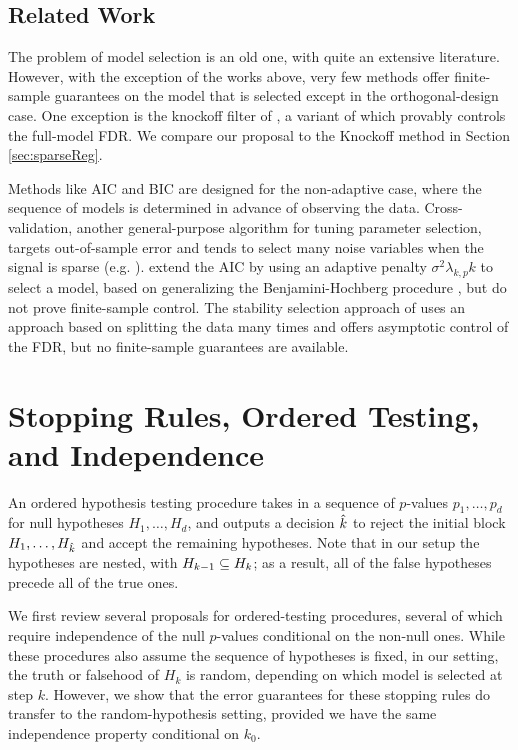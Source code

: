 \documentclass{article}
\begin{document}
\subsection{Related Work}

The problem of model selection is an old one, with quite an extensive literature. However, with the exception of the works above, very few methods offer finite-sample guarantees on the model that is selected except in the orthogonal-design case. One  exception is the knockoff filter of \citet{barber2014controlling}, a variant of which provably controls the full-model FDR.
We compare our proposal to the Knockoff method in Section \ref{sec:sparseReg}.

Methods like AIC \citet{akaike1974new} and BIC \citep{schwarz1978estimating} are designed for the non-adaptive case, where the sequence of models is determined in advance of observing the data. Cross-validation, another general-purpose algorithm for tuning parameter selection, targets out-of-sample error and tends to select many noise variables when the signal is sparse (e.g. \cite{LY2015}).   \citet{benjamini2009simple} extend the AIC by using an adaptive penalty $\sigma^2\lambda_{k,p} k$ to select a model, based on generalizing the Benjamini-Hochberg procedure \citet{benjamini1995controlling}, but do not prove finite-sample control. The stability selection approach of \citet{meinshausen2010stability} uses an approach based on splitting the data many times and offers asymptotic control of the FDR, but no finite-sample guarantees are available.

\section{Stopping Rules, Ordered Testing, and Independence}

An ordered hypothesis testing procedure takes in a sequence of $p$-values $p_1, \ldots, p_d$ for null hypotheses $H_{1}, \ldots, H_{d}$, and outputs a decision $\hat{k}$ to reject the initial block $H_{1}, \ldots, H_{\hat{k}}$ and accept the remaining hypotheses. Note that in our setup the hypotheses are nested, with $H_{k-1} \subseteq H_k$; as a result, all of the false hypotheses precede all of the true ones.

We first review several proposals for ordered-testing procedures, several of which require independence of the null $p$-values conditional on the non-null ones. While these procedures also assume the sequence of hypotheses is fixed, in our setting, the truth or falsehood of $H_k$ is random, depending on which model is selected at step $k$. However, we show that the error guarantees for these stopping rules do transfer to the random-hypothesis setting, provided we have the same independence property conditional on $k_0$.
\end{document}

